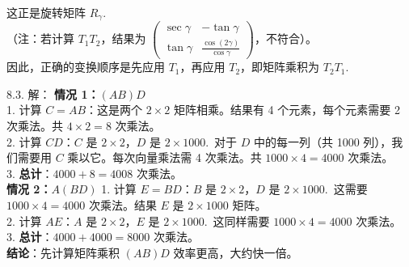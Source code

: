 \begin{exer}
$$\begin{aligned}
\end{aligned}
$$
这正是旋转矩阵 $R_\gamma$.~
\\
（注：若计算 $T_1 T_2$，结果为 $\begin{pmatrix} \sec\gamma & -\tan\gamma \\ \tan\gamma & \frac{\cos(2\gamma)}{\cos\gamma} \end{pmatrix}$，不符合）。
\\
因此，正确的变换顺序是先应用 $T_1$，再应用 $T_2$，即矩阵乘积为 $T_2 T_1$.~

8.3. 解：
\textbf{情况 1：$(AB)D$}\\
1. 计算 $C = AB$：这是两个 $2 \times 2$ 矩阵相乘。结果有 4 个元素，每个元素需要 2 次乘法。共 $4 \times 2 = 8$ 次乘法。\\
2. 计算 $C D$：$C$ 是 $2 \times 2$，$D$ 是 $2 \times 1000$.~对于 $D$ 中的每一列（共 1000 列），我们需要用 $C$ 乘以它。每次向量乘法需 4 次乘法。共 $1000 \times 4 = 4000$ 次乘法。\\
3. \textbf{总计}：$4000 + 8 = 4008$ 次乘法。
\\
\textbf{情况 2：$A(BD)$}
1. 计算 $E = BD$：$B$ 是 $2 \times 2$，$D$ 是 $2 \times 1000$.~这需要 $1000 \times 4 = 4000$ 次乘法。结果 $E$ 是 $2 \times 1000$ 矩阵。\\
2. 计算 $A E$：$A$ 是 $2 \times 2$，$E$ 是 $2 \times 1000$.~这同样需要 $1000 \times 4 = 4000$ 次乘法。\\
3. \textbf{总计}：$4000 + 4000 = 8000$ 次乘法。\\
\textbf{结论}：先计算矩阵乘积 $(AB)D$ 效率更高，大约快一倍。


\end{exer}
